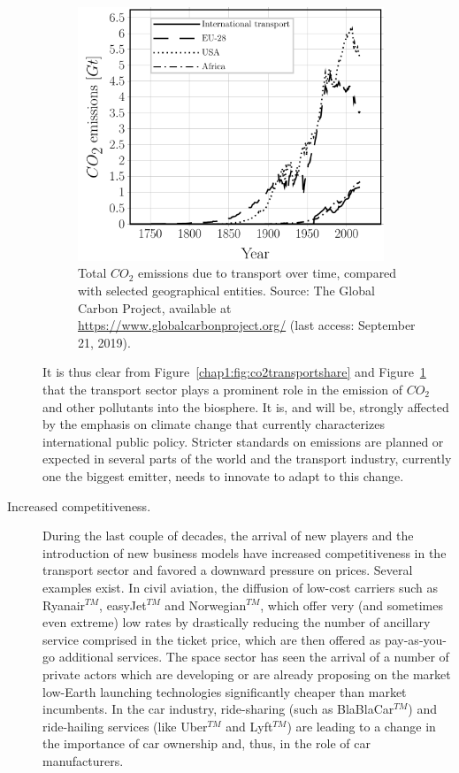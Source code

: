 \begin{description}
\begin{figure}[!h]
\includegraphics[width=0.9\textwidth]{pics/co2transportabsolute.pdf}
\caption{Total $CO_{2}$ emissions due to transport over time, compared with selected geographical entities. Source: The Global Carbon Project, available at \href{https://www.globalcarbonproject.org/}{https://www.globalcarbonproject.org/} (last access: September 21, 2019).}\label{chap1:fig:co2transportabsolute}
\end{figure}

It is thus clear from Figure~\ref{chap1:fig:co2transportshare} and Figure~\ref{chap1:fig:co2transportabsolute} that the transport sector plays a prominent role in the emission of $CO_{2}$ and other pollutants into the biosphere. It is, and will be, strongly affected by the emphasis on climate change that currently characterizes international public policy. Stricter standards on emissions are planned or expected in several parts of the world and the transport industry, currently one the biggest emitter, needs to innovate to adapt to this change.

\item[Increased competitiveness.] During the last couple of decades, the arrival of new players and the introduction of new business models have increased competitiveness in the transport sector and favored a downward pressure on prices. Several examples exist. In civil aviation, the diffusion of low-cost carriers such as Ryanair$^{TM}$, easyJet$^{TM}$ and Norwegian$^{TM}$, which offer very (and sometimes even extreme) low rates by drastically reducing the number of ancillary service comprised in the ticket price, which are then offered as pay-as-you-go additional services. The space sector has seen the arrival of a number of private actors which are developing or are already proposing on the market low-Earth launching technologies significantly cheaper than market incumbents. In the car industry, ride-sharing (such as BlaBlaCar$^{TM}$) and ride-hailing services (like Uber$^{TM}$ and Lyft$^{TM}$) are leading to a change in the importance of car ownership and, thus, in the role of car manufacturers.


\end{description}
